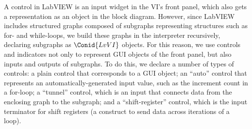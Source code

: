 \resethooks

A control in LabVIEW is an input widget in the VI's front panel, which also
gets a representation as an object in the block diagram. However, since
LabVIEW includes structured graphs composed of subgraphs representing
structures such as for- and while-loops, we build these graphs in the
interpreter recursively, declaring subgraphs as \ensuremath{\Conid{LvVI}} objects. For this
reason, we use controls and indicators not only to represent GUI objects of
the front panel, but also inputs and outputs of subgraphs. To do this, we
declare a number of types of controls: a plain control that corresponds to a
GUI object; an ``auto'' control that represents an automatically-generated input
value, such as the increment count in a for-loop; a ``tunnel'' control, which is
an input that connects data from the enclosing graph to the subgraph; and a
``shift-register'' control, which is the input terminator for shift registers (a
construct to send data across iterations of a loop).

